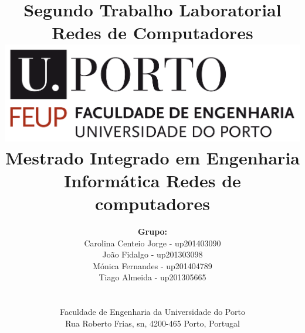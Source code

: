 \documentclass[a4paper]{article}
\begin{document}

\renewcommand{\figurename}{Fig.}

\setlength{\textwidth}{16cm}
\setlength{\textheight}{22cm}

\title{\Huge\textbf{Segundo Trabalho Laboratorial}\linebreak\linebreak\linebreak
\Large\textbf{Redes de Computadores}\linebreak\linebreak
\linebreak\linebreak
\includegraphics[scale=0.1]{feup-logo.png}\linebreak\linebreak
\linebreak\linebreak
\Large{Mestrado Integrado em Engenharia Informática} \linebreak\linebreak
\Large{Redes de computadores}\linebreak
}

\author{\textbf{Grupo:}\\
Carolina Centeio Jorge - up201403090 \\
João Fidalgo - up201303098 \\
Mónica Fernandes - up201404789 \\
Tiago Almeida - up201305665 \\
\linebreak\linebreak \\
 \\ Faculdade de Engenharia da Universidade do Porto \\ Rua Roberto Frias, s\/n, 4200-465 Porto, Portugal \linebreak\linebreak\linebreak
\linebreak\linebreak\vspace{1cm}}
\end{document}
